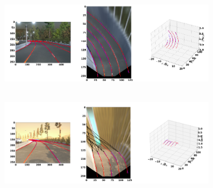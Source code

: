     \begin{figure}[h]
      \caption{Qualitative results of the GenLaneNet\cite{guo2020gen} trained with complex binary lane segmentation architecture on rarely observed scenes from sim3D\cite{} dataset: (a) uphill (b) downhill scenario}
        \centering
        \begin{subfigure}{0.6\textwidth}
        \includegraphics[width=1\linewidth, height=4cm]{images/uphill_rare.png} 
        \caption{}
        \label{fig:subim1}
        \end{subfigure}
        \begin{subfigure}{0.6\textwidth}
        \includegraphics[width=1\linewidth,height=4cm]{images/downhill_rare.png}
        \caption{}
        \label{fig:subim2}
        \end{subfigure}
        \end{figure}
        

